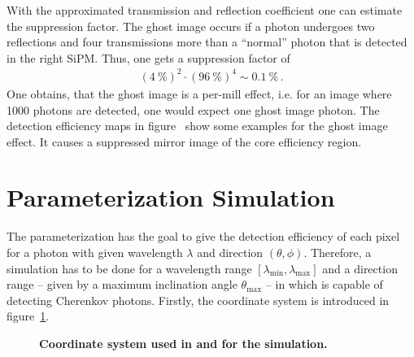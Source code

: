 With the approximated transmission and reflection coefficient one can estimate the suppression factor. The ghost image occurs if a photon undergoes two reflections and four transmissions more than a \enquote{normal} photon that is detected in the right SiPM. Thus, one gets a suppression factor of
\begin{align}
	(\SI{4}{\percent})^2 \cdot (\SI{96}{\percent})^4 \sim \SI{0.1}{\percent}\,.
\end{align}
One obtains, that the ghost image is a per-mill effect, i.e. for an image where \num{1000} photons are detected, one would expect one ghost image photon. The detection efficiency maps in figure~\label{deteff:offaxis_px} show some examples for the ghost image effect. It causes a suppressed mirror image of the core efficiency region.

\section{Parameterization Simulation}

The parameterization has the goal to give the detection efficiency of each pixel for a photon with given wavelength $\lambda$ and direction $(\theta,\phi)$. Therefore, a simulation has to be done for a wavelength range $[\lambda_\text{min}, \lambda_\text{max}]$ and a direction range -- given by a maximum inclination angle $\theta_\text{max}$ -- in which \iceact is capable of detecting Cherenkov photons. Firstly, the \geant coordinate system is introduced in figure~\ref{geant_coords}.\\

\begin{figure}[H]
	\centering
	\begin{subfigure}[t]{0.49\textwidth}
	\end{subfigure}
	\hfill
	\begin{subfigure}[t]{0.49\textwidth}
		\usebox{\savedimage}
	\end{subfigure}
	\caption[Coordinate system used in \geant and for the simulation]{\textbf{Coordinate system used in \geant and for the simulation.} }
	\label{geant_coords}
\end{figure}


